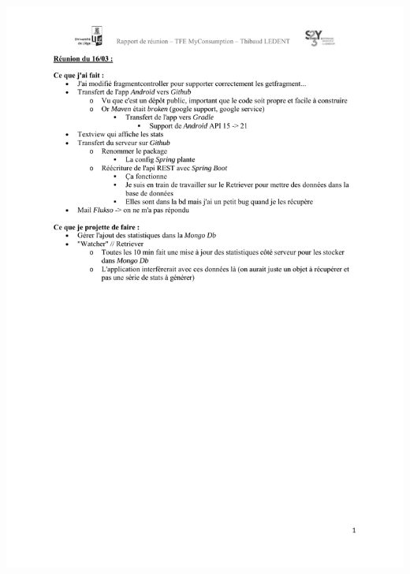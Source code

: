 \documentclass[a4paper, oneside, 11pt]{book}
\begin{document}
\includegraphics[width=1\textwidth]{reports_NB_Part11.pdf}
\newpage
\end{document}
